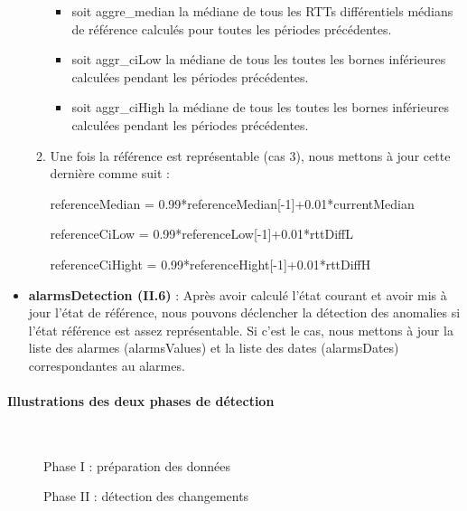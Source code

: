 \begin{itemize}
\begin{enumerate}
\begin{itemize}
\item  soit aggre\_median la médiane de tous les RTTs différentiels médians de référence calculés pour toutes les périodes précédentes. 
	
\item 	soit aggr\_ciLow la médiane de tous les   toutes les bornes inférieures calculées pendant les périodes précédentes.
	
\item 	soit aggr\_ciHigh la médiane de tous les   toutes les bornes inférieures calculées pendant les périodes précédentes.

\end{itemize}

	
	\item Une fois la référence est représentable (cas 3), nous mettons à jour cette dernière comme suit :
	
		referenceMedian =  0.99*referenceMedian[-1]+0.01*currentMedian
	
		 referenceCiLow =	0.99*referenceLow[-1]+0.01*rttDiffL
		 
	referenceCiHight = 0.99*referenceHight[-1]+0.01*rttDiffH
	

	   
	

\end{enumerate}
 \item \textbf{ alarmsDetection (II.6) }: Après avoir calculé l'état courant et avoir mis à jour l'état de
 référence, nous pouvons déclencher la détection des anomalies si l’état référence est assez
 représentable. Si c'est le cas, nous mettons à jour la liste des alarmes  {\color{gray}(alarmsValues)} et la
 liste des dates  {\color{gray}(alarmsDates)} correspondantes au alarmes.
 
  \end{itemize}

\paragraph{ Illustrations des deux phases de détection}~
\newpage

\begin{figure}[H]
	\centering
	\captionsetup{justification=centering}
	\resizebox{!}{\textheight}{
		
	}
	\caption{Phase I : préparation des données }
	\label{fig:step-preparing-data}
\end{figure}

\begin{figure}[H]
	\centering
	\captionsetup{justification=centering}
	\resizebox{\textwidth}{\textheight}{
		
	}
	\caption{Phase II : détection des changements }
	\label{fig:step-detection-anomalies}
\end{figure}

